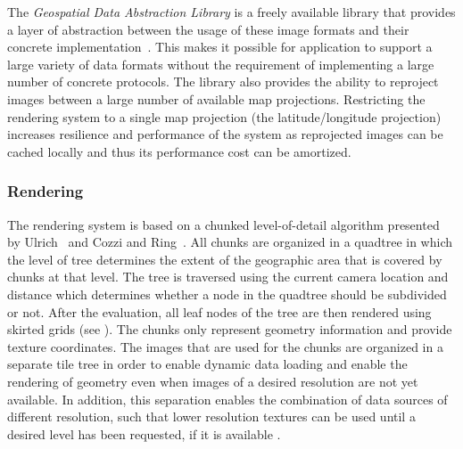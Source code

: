 The \emph{Geospatial Data Abstraction Library} is a freely available library that provides a layer of abstraction between the usage of these image formats and their concrete implementation~\cite{warmerdam2008geospatial}.  This makes it possible for application to support a large variety of data formats without the requirement of implementing a large number of concrete protocols.  The library also provides the ability to reproject images between a large number of available map projections.  Restricting the rendering system to a single map projection (the latitude/longitude projection) increases resilience and performance of the system as reprojected images can be cached locally and thus its performance cost can be amortized.


\subsubsection{Rendering} \label{contributions:astro:gb:rendering}
The rendering system is based on a chunked level-of-detail algorithm presented by Ulrich~\cite{ulrich2002rendering} and Cozzi and Ring~\cite{cozzi20113d}.  All chunks are organized in a quadtree in which the level of tree determines the extent of the geographic area that is covered by chunks at that level.  The tree is traversed using the current camera location and distance which determines whether a node in the quadtree should be subdivided or not.  After the evaluation, all leaf nodes of the tree are then rendered using skirted grids (see ).  The chunks only represent geometry information and provide texture coordinates.  The images that are used for the chunks are organized in a separate tile tree in order to enable dynamic data loading and enable the rendering of geometry even when images of a desired resolution are not yet available.  In addition, this separation enables the combination of data sources of different resolution, such that lower resolution textures can be used until a desired level has been requested, if it is available .

